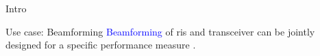 \documentclass[presentation,xcolor={table},9pt]{beamer}
\begin{document}
\begin{section}{Intro}
	\begin{frame}{Use case: Beamforming}
		\textcolor{blue}{Beamforming} of \gls{ris} and transceiver can be jointly designed for a specific performance measure \cite{Wu2020}.
		\begin{figure}
			\centering
\end{figure}
\end{frame}
\end{section}
\end{document}
